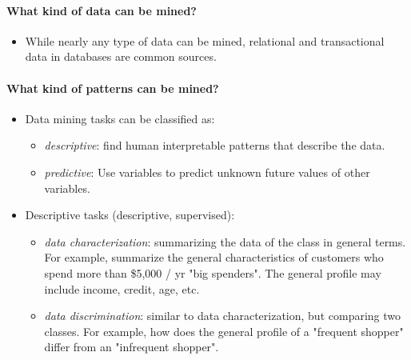 \documentclass[11pt]{article}
\providecommand{\tightlist}{%
      \setlength{\itemsep}{0pt}\setlength{\parskip}{0pt}}
\begin{document}
    \paragraph{What kind of data can be
mined?}\label{what-kind-of-data-can-be-mined}

    \begin{itemize}
\tightlist
\item
  While nearly any type of data can be mined, relational and
  transactional data in databases are common sources.
\end{itemize}

    \paragraph{What kind of patterns can be
mined?}\label{what-kind-of-patterns-can-be-mined}

    \begin{itemize}
\tightlist
\item
  Data mining tasks can be classified as:

  \begin{itemize}
  \tightlist
  \item
    \emph{descriptive}: find human interpretable patterns that describe
    the data.
  \item
    \emph{predictive}: Use variables to predict unknown future values of
    other variables.
  \end{itemize}
\end{itemize}

    \begin{itemize}
\tightlist
\item
  Descriptive tasks (descriptive, supervised):

  \begin{itemize}
  \tightlist
  \item
    \emph{data characterization}: summarizing the data of the class in
    general terms. For example, summarize the general characteristics of
    customers who spend more than \$5,000 / yr "big spenders". The
    general profile may include income, credit, age, etc.
  \item
    \emph{data discrimination}: similar to data characterization, but
    comparing two classes. For example, how does the general profile of
    a "frequent shopper" differ from an "infrequent shopper".
  \end{itemize}
\end{itemize}
\end{document}
